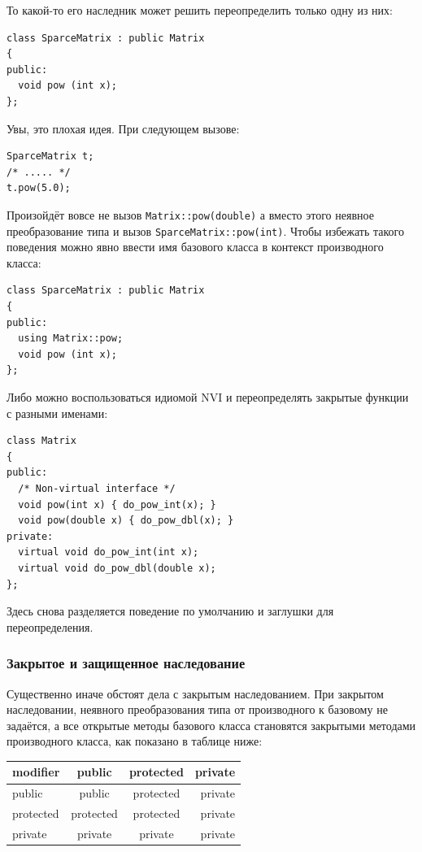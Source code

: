 \documentclass[a4paper,12pt,oneside]{article}
\begin{document}
То какой-то его наследник может решить переопределить только одну из них:

\begin{lstlisting}
class SparceMatrix : public Matrix
{
public:
  void pow (int x);
};
\end{lstlisting}

Увы, это плохая идея. При следующем вызове:

\begin{lstlisting}
SparceMatrix t;
/* ..... */
t.pow(5.0);
\end{lstlisting}

Произойдёт вовсе не вызов \lstinline!Matrix::pow(double)! а вместо этого неявное преобразование типа и вызов \lstinline!SparceMatrix::pow(int)!. Чтобы избежать такого поведения можно явно ввести имя базового класса в контекст производного класса:

\begin{lstlisting}
class SparceMatrix : public Matrix
{
public:
  using Matrix::pow;
  void pow (int x);
};
\end{lstlisting}

Либо можно воспользоваться идиомой NVI и переопределять закрытые функции с разными именами:

\begin{lstlisting}
class Matrix
{
public:
  /* Non-virtual interface */
  void pow(int x) { do_pow_int(x); }
  void pow(double x) { do_pow_dbl(x); }
private:
  virtual void do_pow_int(int x);
  virtual void do_pow_dbl(double x);
};
\end{lstlisting}

Здесь снова разделяется поведение по умолчанию и заглушки для переопределения.

\subsubsection{Закрытое и защищенное наследование}\label{OtherInheritance}

Существенно иначе обстоят дела с закрытым наследованием. При закрытом наследовании, неявного преобразования типа от производного к базовому не задаётся, а все открытые методы базового класса становятся закрытыми методами производного класса, как показано в таблице ниже:

\begin{center}
  \begin{tabular}{ | l | c | c | r | }
    \hline
    modifier & public & protected & private \\ \hline \hline
    public & public & protected & private \\ \hline
    protected & protected & protected & private \\ \hline
    private & private & private & private \\ \hline
  \end{tabular}
\end{center}
\end{document}

